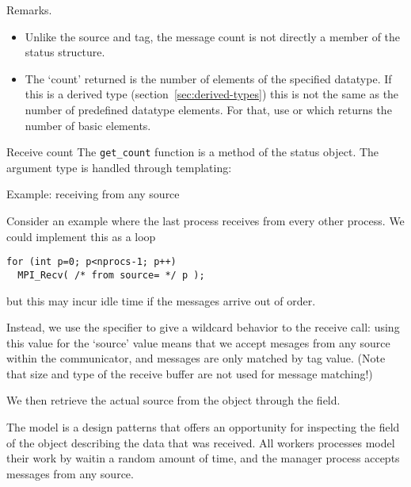 Remarks.
\begin{itemize}
\item Unlike the source and tag, the message count is not directly a member of the status
  structure.
\item The `count' returned is the number of elements of the specified
  datatype. If this is a derived type
  (section~\ref{sec:derived-types}) this is not the same as the number
  of predefined datatype elements. For that, use
   or
  which returns the number of basic elements.
\end{itemize}

\begin{mplnote}{Receive count}
  The \lstinline+get_count+ function is a method of the status object.
  The argument type is handled through templating:
\end{mplnote}

 {Example: receiving from any source}

Consider an example where the last process receives from every other process.
We could implement this as a loop
\begin{lstlisting}
for (int p=0; p<nprocs-1; p++)
  MPI_Recv( /* from source= */ p );
\end{lstlisting}
but this may incur idle time if the messages arrive out of order.

Instead, we use the   specifier to give a wildcard
behavior to the receive call: using this value for the `source' value
means that we accept mesages from any source within the communicator,
and messages are only matched by tag value.
(Note that size and type of the receive buffer are not used for message matching!)

We then retrieve the
actual source from the  object through the
 field.
%
%

The  model is a
design patterns that offers an opportunity for inspecting the
 field of the 
object describing the data that was received.
All workers processes model their work by waitin a random amount of time,
and the manager process accepts messages from any source.


